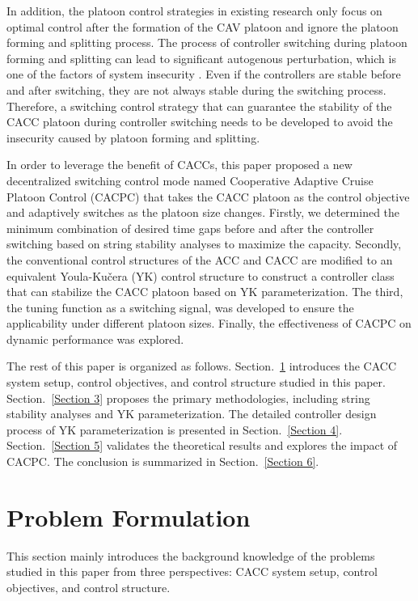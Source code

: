 \documentclass[journal]{IEEEtran}
\begin{document}
In addition, the platoon control strategies in existing research only focus on optimal control after the formation of the CAV platoon and ignore the platoon forming and splitting process. The process of controller switching during platoon forming and splitting can lead to significant autogenous perturbation, which is one of the factors of system insecurity \citep{Stefanovic2008}. Even if the controllers are stable before and after switching, they are not always stable during the switching process. Therefore, a switching control strategy that can guarantee the stability of the CACC platoon during controller switching needs to be developed to avoid the insecurity caused by platoon forming and splitting.

In order to leverage the benefit of CACCs, this paper proposed a new decentralized switching control mode named Cooperative Adaptive Cruise Platoon Control (CACPC) that takes the CACC platoon as the control objective and adaptively switches as the platoon size changes. Firstly, we determined the minimum combination of desired time gaps before and after the controller switching based on string stability analyses to maximize the capacity. Secondly, the conventional control structures of the ACC and CACC are modified to an equivalent Youla-Kučera (YK) control structure to construct a controller class that can stabilize the CACC platoon based on YK parameterization. The third, the tuning function as a switching signal, was developed to ensure the applicability under different platoon sizes. Finally, the effectiveness of CACPC on dynamic performance was explored.

The rest of this paper is organized as follows. Section.~\ref{Section 2} introduces the CACC system setup, control objectives, and control structure studied in this paper. Section.~\ref{Section 3} proposes the primary methodologies, including string stability analyses and YK parameterization. The detailed controller design process of YK parameterization is presented in Section.~\ref{Section 4}. Section.~\ref{Section 5} validates the theoretical results and explores the impact of CACPC. The conclusion is summarized in Section.~\ref{Section 6}.



\section{Problem Formulation}
\label{Section 2}
This section mainly introduces the background knowledge of the problems studied in this paper from three perspectives: CACC system setup, control objectives, and control structure.
\end{document}
